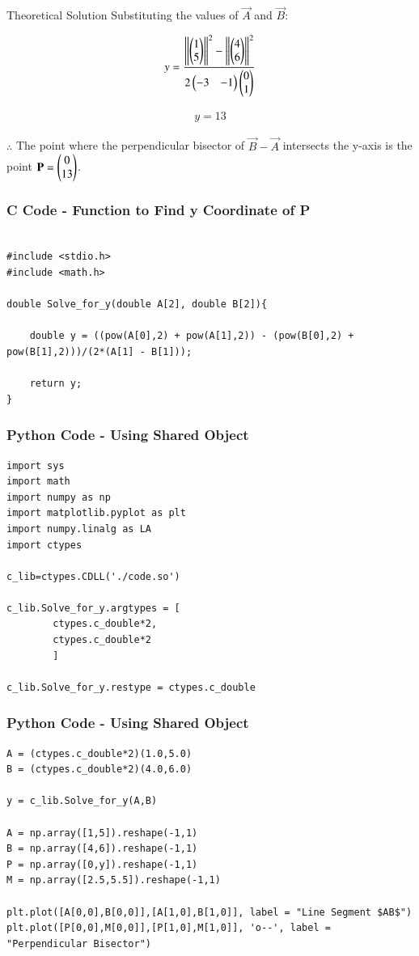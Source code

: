 \documentclass{beamer}
\begin{document}
\begin{frame}{Theoretical Solution}
Substituting the values of $\vec{A}$ and $\vec{B}$:

\begin{align}
    y = \frac{\left\lVert\begin{pmatrix}1\\5\end{pmatrix}\right\rVert^2 - \left\lVert\begin{pmatrix}4\\6\end{pmatrix}\right\rVert^2}{2\begin{pmatrix}-3 & -1\end{pmatrix}\begin{pmatrix}0\\1\end{pmatrix}}
\end{align}

\begin{align}
    y = 13
\end{align}

$\therefore$ The point where the perpendicular bisector of $\vec{B}-\vec{A}$ intersects the y-axis is the point $\mathbf{P}=\begin{pmatrix}0\\13\end{pmatrix}$.
\end{frame}


\begin{frame}[fragile]
    \frametitle{C Code - Function to Find y Coordinate of P}

    \begin{lstlisting}

#include <stdio.h>
#include <math.h>

double Solve_for_y(double A[2], double B[2]){
	
	double y = ((pow(A[0],2) + pow(A[1],2)) - (pow(B[0],2) + pow(B[1],2)))/(2*(A[1] - B[1]));
	
	return y;
}
    \end{lstlisting}

\end{frame}

\begin{frame}[fragile]
    \frametitle{Python Code - Using Shared Object}
    \begin{lstlisting}
import sys
import math
import numpy as np
import matplotlib.pyplot as plt
import numpy.linalg as LA
import ctypes

c_lib=ctypes.CDLL('./code.so')

c_lib.Solve_for_y.argtypes = [
        ctypes.c_double*2,
        ctypes.c_double*2
        ]

c_lib.Solve_for_y.restype = ctypes.c_double

\end{lstlisting}
\end{frame}

\begin{frame}[fragile]
    \frametitle{Python Code - Using Shared Object}
    \begin{lstlisting}
A = (ctypes.c_double*2)(1.0,5.0)
B = (ctypes.c_double*2)(4.0,6.0)

y = c_lib.Solve_for_y(A,B)

A = np.array([1,5]).reshape(-1,1)
B = np.array([4,6]).reshape(-1,1)
P = np.array([0,y]).reshape(-1,1)
M = np.array([2.5,5.5]).reshape(-1,1)

plt.plot([A[0,0],B[0,0]],[A[1,0],B[1,0]], label = "Line Segment $AB$")
plt.plot([P[0,0],M[0,0]],[P[1,0],M[1,0]], 'o--', label = "Perpendicular Bisector")

\end{lstlisting}
\end{frame}
\end{document}
